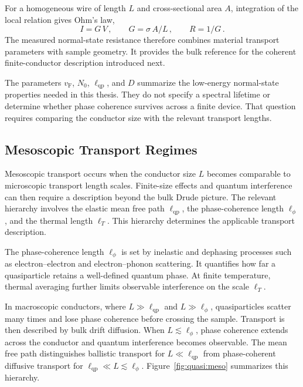            For a homogeneous wire of length $L$ and cross-sectional area $A$, integration of the local relation gives Ohm's law,
            \begin{equation}
                I = G\,V\,,
                \qquad
                G = \sigma\,A/L\,,
                \qquad
                R = 1/G\,.
            \end{equation}
            The measured normal-state resistance therefore combines material transport parameters with sample geometry. It provides the bulk reference for the coherent finite-conductor description introduced next. \cite{ohm_galvanische_1827}

            The parameters $v_\mathrm{F}$, $N_0$, $\ell_\mathrm{qp}$, and $D$ summarize the low-energy normal-state properties needed in this thesis. They do not specify a spectral lifetime or determine whether phase coherence survives across a finite device. That question requires comparing the conductor size with the relevant transport lengths.

    \subsection{Mesoscopic Transport Regimes}
    \label{subsec:quasi:meso}

        Mesoscopic transport occurs when the conductor size $L$ becomes comparable to microscopic transport length scales. Finite-size effects and quantum interference can then require a description beyond the bulk Drude picture. The relevant hierarchy involves the elastic mean free path $\ell_\mathrm{qp}$, the phase-coherence length $\ell_\phi$, and the thermal length $\ell_T$. This hierarchy determines the applicable transport description.

        The phase-coherence length $\ell_\phi$ is set by inelastic and dephasing processes such as electron--electron and electron--phonon scattering. It quantifies how far a quasiparticle retains a well-defined quantum phase. At finite temperature, thermal averaging further limits observable interference on the scale $\ell_T$.

        In macroscopic conductors, where $L \gg \ell_\mathrm{qp}$ and $L \gg \ell_\phi$, quasiparticles scatter many times and lose phase coherence before crossing the sample. Transport is then described by bulk drift diffusion. When $L \lesssim \ell_\phi$, phase coherence extends across the conductor and quantum interference becomes observable. The mean free path distinguishes ballistic transport for $L \ll \ell_\mathrm{qp}$ from phase-coherent diffusive transport for $\ell_\mathrm{qp} \ll L \lesssim \ell_\phi$. Figure~\ref{fig:quasi:meso} summarizes this hierarchy. \cite{gross_festkorperphysik_2014,beenakker_random-matrix_1997}

